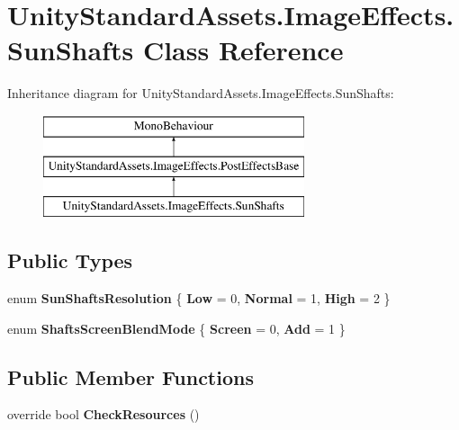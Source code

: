 \hypertarget{class_unity_standard_assets_1_1_image_effects_1_1_sun_shafts}{}\section{Unity\+Standard\+Assets.\+Image\+Effects.\+Sun\+Shafts Class Reference}
\label{class_unity_standard_assets_1_1_image_effects_1_1_sun_shafts}
Inheritance diagram for Unity\+Standard\+Assets.\+Image\+Effects.\+Sun\+Shafts\+:\begin{figure}[H]
\begin{center}
\leavevmode
\includegraphics[height=3.000000cm]{class_unity_standard_assets_1_1_image_effects_1_1_sun_shafts}
\end{center}
\end{figure}
\subsection*{Public Types}
\begin{DoxyCompactItemize}
\item 
enum {\bfseries Sun\+Shafts\+Resolution} \{ {\bfseries Low} = 0, 
{\bfseries Normal} = 1, 
{\bfseries High} = 2
 \}\hypertarget{class_unity_standard_assets_1_1_image_effects_1_1_sun_shafts_a6a2e4e71e122d0845ba712e1f3f36b21}{}\label{class_unity_standard_assets_1_1_image_effects_1_1_sun_shafts_a6a2e4e71e122d0845ba712e1f3f36b21}

\item 
enum {\bfseries Shafts\+Screen\+Blend\+Mode} \{ {\bfseries Screen} = 0, 
{\bfseries Add} = 1
 \}\hypertarget{class_unity_standard_assets_1_1_image_effects_1_1_sun_shafts_a16577ac660a8afd1a280e59000343662}{}\label{class_unity_standard_assets_1_1_image_effects_1_1_sun_shafts_a16577ac660a8afd1a280e59000343662}

\end{DoxyCompactItemize}
\subsection*{Public Member Functions}
\begin{DoxyCompactItemize}
\item 
override bool {\bfseries Check\+Resources} ()\hypertarget{class_unity_standard_assets_1_1_image_effects_1_1_sun_shafts_a46ba317bea3182a8d6ff88a52744ff9c}{}\label{class_unity_standard_assets_1_1_image_effects_1_1_sun_shafts_a46ba317bea3182a8d6ff88a52744ff9c}

\end{DoxyCompactItemize}
